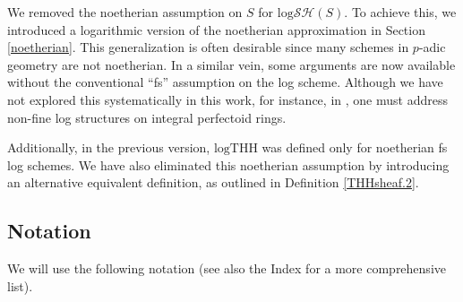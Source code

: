 \documentclass[11pt, a4paper]{amsart}
\theoremstyle{definition}
\numberwithin{equation}{subsection}
\newcommand{\logTHH}{\mathrm{logTHH}}
\newcommand{\inflogSH}{\mathrm{log}\mathcal{SH}}
\begin{document}
We removed the noetherian assumption on \( S \) for \( \inflogSH(S) \). To achieve this, we introduced a logarithmic version of the noetherian approximation in Section \ref{noetherian}. This generalization is often desirable since many schemes in \( p \)-adic geometry are not noetherian. In a similar vein, some arguments are now available without the conventional “fs” assumption on the log scheme. Although we have not explored this systematically in this work, for instance, in \cite{BKV}, one must address non-fine log structures on integral perfectoid rings.

Additionally, in the previous version, \( \logTHH \) was defined only for noetherian fs log schemes. We have also eliminated this noetherian assumption by introducing an alternative equivalent definition, as outlined in Definition \ref{THHsheaf.2}.




\subsection{Notation}

We will use the following notation (see also the Index for a more comprehensive list).

\vspace{0.1in}
\end{document}
